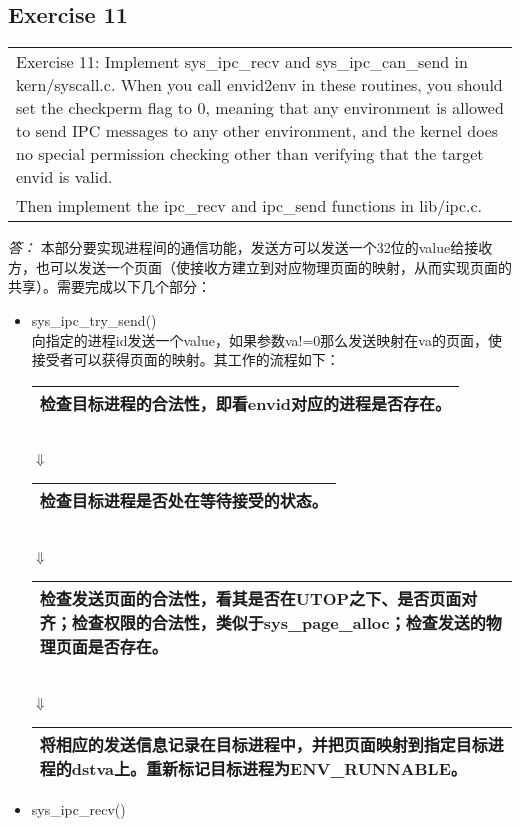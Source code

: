 \documentclass[11pt,a4paper]{article}
\newcommand{\exercise}[2]{
\begin{tabular}{|p{\textwidth}|}
\hline
#1: #2\\
\hline
\end{tabular}
\textit{\large{答：}}}
\begin{document}
\subsection{Exercise 11}
\exercise{Exercise 11}{Implement sys\_ipc\_recv and sys\_ipc\_can\_send in kern/syscall.c. When you call envid2env in these routines, you should set the checkperm flag to 0, meaning that any environment is allowed to send IPC messages to any other environment, and the kernel does no special permission checking other than verifying that the target envid is valid.\\
Then implement the ipc\_recv and ipc\_send functions in lib/ipc.c. }
本部分要实现进程间的通信功能，发送方可以发送一个32位的value给接收方，也可以发送一个页面（使接收方建立到对应物理页面的映射，从而实现页面的共享）。需要完成以下几个部分：
\begin{itemize}
\item sys\_ipc\_try\_send()\\
向指定的进程id发送一个value，如果参数va!=0那么发送映射在va的页面，使接受者可以获得页面的映射。其工作的流程如下：\\
\begin{tabular}{|p{}|}
\hline
检查目标进程的合法性，即看envid对应的进程是否存在。\\
\hline
\end{tabular}
\\$\Downarrow$\\
\begin{tabular}{|p{}|}
\hline
检查目标进程是否处在等待接受的状态。\\
\hline
\end{tabular}
\\$\Downarrow$\\
\begin{tabular}{|p{}|}
\hline
检查发送页面的合法性，看其是否在UTOP之下、是否页面对齐；检查权限的合法性，类似于sys\_page\_alloc；检查发送的物理页面是否存在。\\
\hline
\end{tabular}
\\$\Downarrow$\\
\begin{tabular}{|p{}|}
\hline
将相应的发送信息记录在目标进程中，并把页面映射到指定目标进程的dstva上。重新标记目标进程为ENV\_RUNNABLE。\\
\hline
\end{tabular}
\item sys\_ipc\_recv()\\

\end{itemize}
\end{document}
